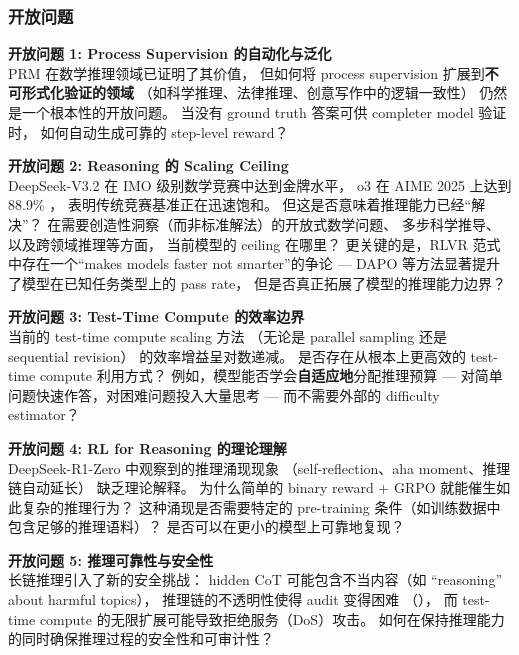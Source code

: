\subsubsection{开放问题}

\begin{openproblembox}
\textbf{开放问题 1: Process Supervision 的自动化与泛化}\\
PRM 在数学推理领域已证明了其价值，
但如何将 process supervision 扩展到\textbf{不可形式化验证的领域}
（如科学推理、法律推理、创意写作中的逻辑一致性）
仍然是一个根本性的开放问题。
当没有 ground truth 答案可供 completer model 验证时，
如何自动生成可靠的 step-level reward？
\end{openproblembox}

\begin{openproblembox}
\textbf{开放问题 2: Reasoning 的 Scaling Ceiling}\\
DeepSeek-V3.2 \cite{deepseek2025v32} 在 IMO 级别数学竞赛中达到金牌水平，
o3 在 AIME 2025 上达到 88.9\% \cite{openai2025o3}，
表明传统竞赛基准正在迅速饱和。
但这是否意味着推理能力已经``解决''？
在需要创造性洞察（而非标准解法）的开放式数学问题、
多步科学推导、以及跨领域推理等方面，
当前模型的 ceiling 在哪里？
更关键的是，RLVR 范式中存在一个``makes models faster not smarter''的争论 ---
DAPO 等方法显著提升了模型在已知任务类型上的 pass rate，
但是否真正拓展了模型的推理能力边界？
\end{openproblembox}

\begin{openproblembox}
\textbf{开放问题 3: Test-Time Compute 的效率边界}\\
当前的 test-time compute scaling 方法
（无论是 parallel sampling 还是 sequential revision）
的效率增益呈对数递减。
是否存在从根本上更高效的 test-time compute 利用方式？
例如，模型能否学会\textbf{自适应地}分配推理预算 ---
对简单问题快速作答，对困难问题投入大量思考 ---
而不需要外部的 difficulty estimator？
\end{openproblembox}

\begin{openproblembox}
\textbf{开放问题 4: RL for Reasoning 的理论理解}\\
DeepSeek-R1-Zero 中观察到的推理涌现现象
（self-reflection、aha moment、推理链自动延长）
缺乏理论解释。
为什么简单的 binary reward + GRPO 就能催生如此复杂的推理行为？
这种涌现是否需要特定的 pre-training 条件（如训练数据中包含足够的推理语料）？
是否可以在更小的模型上可靠地复现？
\end{openproblembox}

\begin{openproblembox}
\textbf{开放问题 5: 推理可靠性与安全性}\\
长链推理引入了新的安全挑战：
hidden CoT 可能包含不当内容（如 ``reasoning'' about harmful topics），
推理链的不透明性使得 audit 变得困难
（），
而 test-time compute 的无限扩展可能导致拒绝服务（DoS）攻击。
如何在保持推理能力的同时确保推理过程的安全性和可审计性？
\end{openproblembox}

